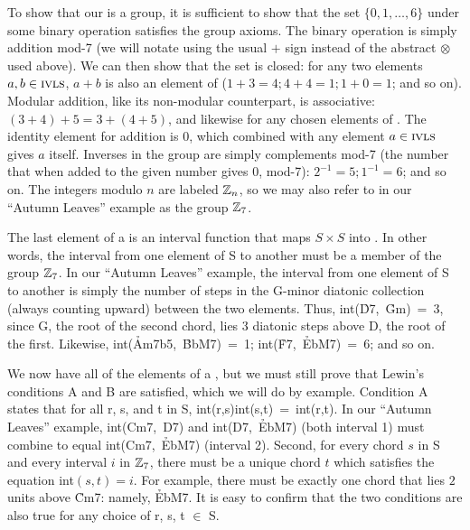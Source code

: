 \documentclass[diss]{subfiles}
\begin{document}
To show that our \ivls{} is a group, it is sufficient to show that the set
$\{0,1,\ldots,6\}$ under some binary operation satisfies the group axioms. The
binary operation is simply addition mod-7 (we will notate using the usual $+$
sign instead of the abstract $\otimes$ used above).  We can then show that the
set \ivls{} is closed: for any two elements $a, b \in \mathrm{\textsc{ivls}{}}$, $a + b$ is
also an element of \ivls{} ($1 + 3 = 4; 4 + 4 = 1; 1 + 0 = 1$; and so on).
Modular addition, like its non-modular counterpart, is associative:
$(3 + 4) + 5 = 3 + (4 + 5)$, and likewise for any chosen elements of \ivls{}.
The identity element for addition is 0, which combined with any element $a \in
\mathrm{\textsc{ivls}{}}$ gives $a$ itself. Inverses in the group are simply complements
mod-7 (the number that when added to the given number gives 0, mod-7):
$2^{-1} = 5; 1^{-1} = 6$; and so on. The integers modulo $n$ are labeled
$\mathbb{Z}_n$, so we may also refer to \ivls{} in our “Autumn Leaves” example as
the group $\mathbb{Z}_7$.

The last element of a \gis{} is an interval function that maps $S \times S$ into
\ivls{}. In other words, the interval from one element of S to another must be a
member of the group $\mathbb{Z}_7$. In our “Autumn Leaves” example, the interval
from one element of S to another is simply the number of steps in the G-minor
diatonic collection (always counting upward) between the two elements. Thus,
\mbox{int(\h{D7}, \h{Gm}) = 3}, since G, the root of the second chord, lies
3 diatonic steps above D, the root of the first. Likewise,
\mbox{int(\h{Am7b5}, \h{BbM7}) = 1}; \mbox{int(\h{F7}, \h{EbM7}) = 6}; and so
on.

We now have all of the elements of a \gis{}, but we must still prove that Lewin’s
conditions A and B are satisfied, which we will do by example. Condition A
states that for all r, s, and t in S, \mbox{int(r,s)int(s,t) = int(r,t)}. In
our “Autumn Leaves” example, \mbox{int(Cm7, D7)} and \mbox{int(D7, \h{EbM7})}
(both interval 1) must combine to equal \mbox{int(Cm7, \h{EbM7})} (interval
2). Second, for every chord $s$ in S and every interval $i$ in $\mathbb{Z}_7$,
there must be a unique chord $t$ which satisfies the equation \mbox{int$(s,t)
= i$}. For example, there must be exactly one chord that lies $2$ units above
\h{Cm7}: namely, \h{EbM7}. It is easy to confirm that the two conditions
are also true for any choice of r, s, t $\in$ S.
\end{document}
